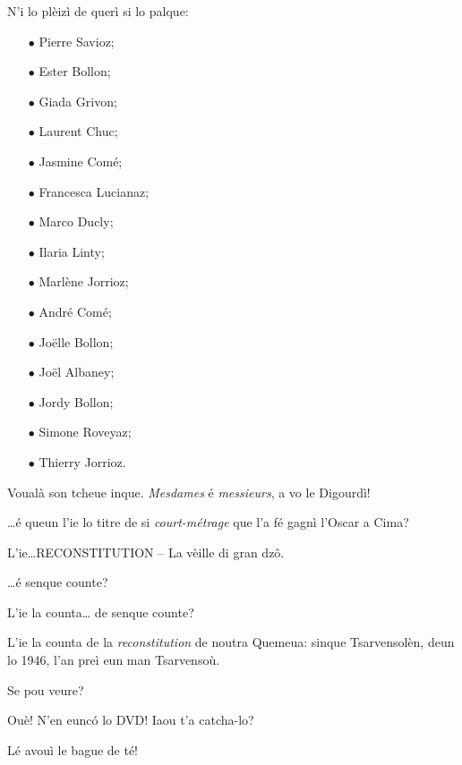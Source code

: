 \begin{drama}
\Conducteurspeaks N'i lo plèizì de querì si lo palque:
\begin{itemize}
\item[$\bullet$] Pierre Savioz;
\item[$\bullet$] Ester Bollon;
\item[$\bullet$] Giada Grivon;
\item[$\bullet$] Laurent Chuc;
\item[$\bullet$] Jasmine Comé;
\item[$\bullet$] Francesca Lucianaz;
\item[$\bullet$] Marco Ducly;
\item[$\bullet$] Ilaria Linty;
\item[$\bullet$] Marlène Jorrioz;
\item[$\bullet$] André Comé;
\item[$\bullet$] Jo\"{e}lle Bollon;
\item[$\bullet$] Jo\"{e}l Albaney;
\item[$\bullet$] Jordy Bollon;
\item[$\bullet$] Simone Roveyaz;
\item[$\bullet$] Thierry Jorrioz.
\end{itemize}


\Conducteurspeaks Voualà son tcheue inque. \textit{Mesdames} é \textit{messieurs}, a vo le Digourdì!




\Nevaouspeaks \ldots é queun l'ie lo titre de si \textit{court-métrage} que l'a fé gagnì l’Oscar a Cima?

\Paganspeaks L'ie\ldots \og RECONSTITUTION – La vèille di gran dz\^o\fg.

\Nevaousaspeaks \ldots é senque counte?

\Paganspeaks L'ie la counta\ldots {} de senque counte?

\Maganspeaks L'ie la counta de la \textit{reconstitution} de noutra Quemeua: sinque Tsarvensolèn, deun lo 1946, l'an preì eun man Tsarvensoù.

\Nevaouspeaks Se pou veure?

\Paganspeaks Ouè! N'en euncó lo DVD! Iaou t'a catcha-lo?

\Maganspeaks Lé avouì le bague de té!


\end{drama}
